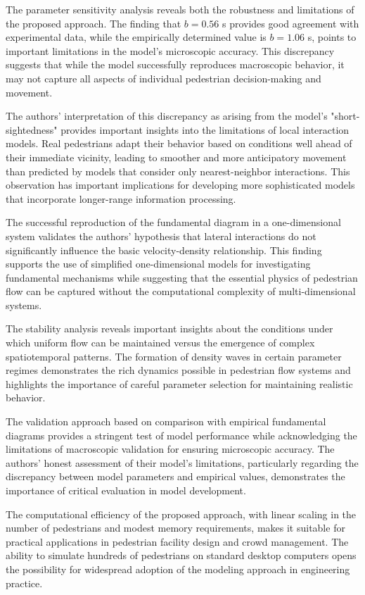 \documentclass[12pt,a4paper]{article}
\begin{document}
The parameter sensitivity analysis reveals both the robustness and limitations of the proposed approach. The finding that $b = 0.56$ s provides good agreement with experimental data, while the empirically determined value is $b = 1.06$ s, points to important limitations in the model's microscopic accuracy. This discrepancy suggests that while the model successfully reproduces macroscopic behavior, it may not capture all aspects of individual pedestrian decision-making and movement.

The authors' interpretation of this discrepancy as arising from the model's "short-sightedness" provides important insights into the limitations of local interaction models. Real pedestrians adapt their behavior based on conditions well ahead of their immediate vicinity, leading to smoother and more anticipatory movement than predicted by models that consider only nearest-neighbor interactions. This observation has important implications for developing more sophisticated models that incorporate longer-range information processing.

The successful reproduction of the fundamental diagram in a one-dimensional system validates the authors' hypothesis that lateral interactions do not significantly influence the basic velocity-density relationship. This finding supports the use of simplified one-dimensional models for investigating fundamental mechanisms while suggesting that the essential physics of pedestrian flow can be captured without the computational complexity of multi-dimensional systems.

The stability analysis reveals important insights about the conditions under which uniform flow can be maintained versus the emergence of complex spatiotemporal patterns. The formation of density waves in certain parameter regimes demonstrates the rich dynamics possible in pedestrian flow systems and highlights the importance of careful parameter selection for maintaining realistic behavior.

The validation approach based on comparison with empirical fundamental diagrams provides a stringent test of model performance while acknowledging the limitations of macroscopic validation for ensuring microscopic accuracy. The authors' honest assessment of their model's limitations, particularly regarding the discrepancy between model parameters and empirical values, demonstrates the importance of critical evaluation in model development.

The computational efficiency of the proposed approach, with linear scaling in the number of pedestrians and modest memory requirements, makes it suitable for practical applications in pedestrian facility design and crowd management. The ability to simulate hundreds of pedestrians on standard desktop computers opens the possibility for widespread adoption of the modeling approach in engineering practice.
\end{document}
